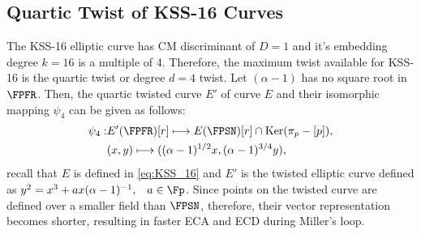 \subsection{Quartic Twist of KSS-16 Curves}  \label{Quartic_twist}
The KSS-16 elliptic curve has CM discriminant of $D = 1$ and it's embedding degree $k=16$ is a multiple of 4. 
Therefore, the maximum twist available for KSS-16 is the quartic twist or degree $d=4$ twist.
Let $(\alpha-1)$ has no square root in $\FPFR$.  
Then, the quartic twisted curve $E'$ of curve $E$  and their isomorphic mapping $\psi_4$ can be given as follows:
\begin{align}
\psi_4: & E'(\FPFR)[r] \longmapsto E(\FPSN)[r]\cap {\rm Ker}(\pi_p-[p]),\nonumber\\
& (x,y)\longmapsto  ((\alpha-1)^{1/2}x,(\alpha-1)^{3/4}y),\label{twist_q_to_q'}
\end{align}
recall that $E$ is defined in \eqref{eq:KSS_16} and $E'$ is the twisted elliptic curve defined as $y^2=  x^3+ax(\alpha-1)^{-1},\;\;\;a\in\Fp$.
Since points on the twisted curve are defined over a smaller field than $\FPSN$, therefore, their vector representation becomes shorter, resulting in faster ECA and ECD during Miller's loop. 
